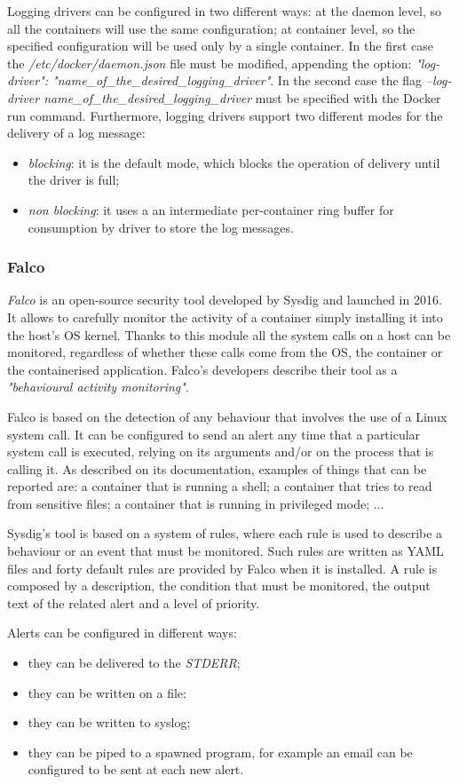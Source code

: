 \documentclass[a4paper,12pt]{article}
\begin{document}
Logging drivers can be configured in two different ways: at the daemon level, so
all the containers will use the same configuration; at container level, so the
specified configuration will be used only by a single container. In the first
case the \textit{/etc/docker/daemon.json} file must be modified, appending the
option: \textit{"log-driver": "name\_of\_the\_desired\_logging\_driver"}. In the
second case the flag \textit{--log-driver
name\_of\_the\_desired\_logging\_driver} must be specified with the Docker run
command. Furthermore, logging drivers support two different modes for the
delivery of a log message:
\begin{itemize} 
  \item \textit{blocking}: it is the default mode, which blocks the operation of
  delivery until the driver is full;
  \item \textit{non blocking}: it uses a an intermediate per-container ring
  buffer for consumption by driver to store the log messages.
\end{itemize}

\subsubsection{Falco}
 
\textit{Falco} \cite{sysdig_falco} is an open-source security tool developed by
Sysdig and launched in 2016. It allows to carefully monitor the activity of a
container simply installing it into the host's OS kernel. Thanks to this module
all the system calls on a host can be monitored, regardless of whether these
calls come from the OS, the container or the containerised application. Falco's
developers describe their tool as a \textit{"behavioural activity monitoring"}.
\par Falco is based on the detection of any behaviour that involves the use of a
Linux system call. It can be configured to send an alert any time that a
particular system call is executed, relying on its arguments and/or on the
process that is calling it. As described on its documentation, examples of
things that can be reported are: a container that is running a shell; a
container that tries to read from sensitive files; a container that is running
in privileged mode; ... \par Sysdig's tool is based on a system of rules, where
each rule is used to describe a behaviour or an event that must be monitored.
Such rules are written as YAML files and forty default rules are provided by
Falco when it is installed. A rule is composed by a description, the condition
that must be monitored, the output text of the related alert and a level of
priority. \par Alerts can be configured in different ways:
\begin{itemize}
  \item they can be delivered to the \textit{STDERR};
  \item they can be written on a file;
  \item they can be written to syslog;
  \item they can be piped to a spawned program, for example an email can be
  configured to be sent at each new alert.
\end{itemize}
\end{document}
